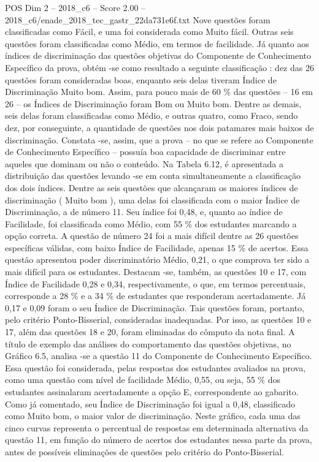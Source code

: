 \begin{textsample}{POS Dim 2 – 2018\_c6 – Score 2.00 – 2018\_c6/enade\_2018\_tec\_gastr\_22da731e6f.txt}
Nove questões foram classificadas como Fácil, e uma foi considerada como Muito fácil.
Outras seis questões foram classificadas como Médio, em termos de facilidade.
Já quanto aos índices de discriminação das questões objetivas do Componente de Conhecimento Específico da prova, obtém -se como resultado a seguinte classificação : dez das 26 questões foram consideradas boas, enquanto seis delas tiveram Índice de Discriminação Muito bom.
Assim, para pouco mais de 60 \% das questões – 16 em 26 – os Índices de Discriminação foram Bom ou Muito bom.
Dentre as demais, seis delas foram classificadas como Médio, e outras quatro, como Fraco, sendo dez, por conseguinte, a quantidade de questões nos dois patamares mais baixos de discriminação.
Constata -se, assim, que a prova – no que se refere ao Componente de Conhecimento Específico – possuía boa capacidade de discriminar entre aqueles que dominam ou não o conteúdo.
Na Tabela 6.12, é apresentada a distribuição das questões levando -se em conta simultaneamente a classificação dos dois índices.
Dentre as seis questões que alcançaram os maiores índices de discriminação ( Muito bom ), uma delas foi classificada com o maior Índice de Discriminação, a de número 11.
Seu índice foi 0,48, e, quanto ao índice de Facilidade, foi classificada como Médio, com 55 \% dos estudantes marcando a opção correta.
A questão de número 24 foi a mais difícil dentre as 26 questões específicas válidas, com baixo Índice de Facilidade, apenas 15 \% de acertos.
Essa questão apresentou poder discriminatório Médio, 0,21, o que comprova ter sido a mais difícil para os estudantes.
Destacam -se, também, as questões 10 e 17, com Índice de Facilidade 0,28 e 0,34, respectivamente, o que, em termos percentuais, corresponde a 28 \% e a 34 \% de estudantes que responderam acertadamente.
Já 0,17 e 0,09 foram o seu Índice de Discriminação.
Tais questões foram, portanto, pelo critério Ponto-Bisserial, consideradas inadequadas.
Por isso, as questões 10 e 17, além das questões 18 e 20, foram eliminadas do cômputo da nota final.
A título de exemplo das análises do comportamento das questões objetivas, no Gráfico 6.5, analisa -se a questão 11 do Componente de Conhecimento Específico.
Essa questão foi considerada, pelas respostas dos estudantes avaliados na prova, como uma questão com nível de facilidade Médio, 0,55, ou seja, 55 \% dos estudantes assinalaram acertadamente a opção E, correspondente ao gabarito.
Como já comentado, seu Índice de Discriminação foi igual a 0,48, classificado como Muito bom, o maior valor de discriminação.
Neste gráfico, cada uma das cinco curvas representa o percentual de respostas em determinada alternativa da questão 11, em função do número de acertos dos estudantes nessa parte da prova, antes de possíveis eliminações de questões pelo critério do Ponto-Bisserial.

\end{textsample}
